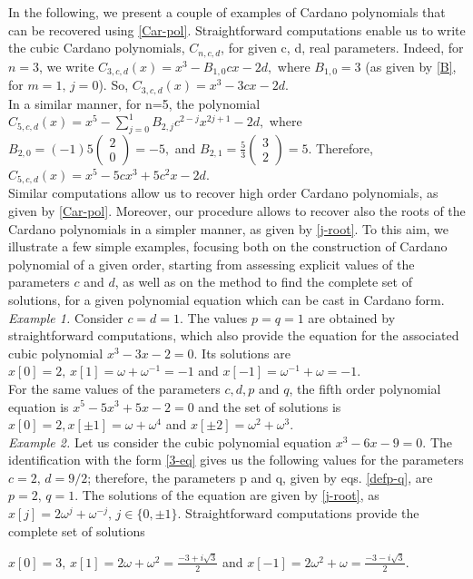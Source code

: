 \documentclass[11pt,reqno]{amsart}
\begin{document}
In the following, we present a couple of examples of Cardano polynomials that can be recovered using \eqref{Car-pol}. 
Straightforward computations enable us to write the cubic Cardano polynomials, $C_{n,c,d}$, for given c, d, real parameters. Indeed, for $n=3$, we write $C_{3,c,d}(x)=x^3-B_{1,0}cx-2d,$ where $B_{1,0}=3 $  (as given by \eqref{B}, for $m=1,\, j=0$). So, $C_{3,c,d}(x)=x^3-3cx-2d$.
\\
 In a similar manner, for n=5, the polynomial $C_{5,c,d}(x)=x^5-\sum\limits_{j=0}^{1}B_{2,j}c^{2-j}x^{2j+1}-2d,$    where
$B_{2,0}=(-1)5\begin{pmatrix}
    2\\0
\end{pmatrix}=-5, $ and $B_{2,1}=\frac{5}{3}\begin{pmatrix}
    3\\2
\end{pmatrix}=5.$ Therefore, $C_{5,c,d}(x)=x^5-5cx^3+5c^2x-2d$. \\Similar computations allow us to recover high order Cardano polynomials, as given by \eqref{Car-pol}.
Moreover, our procedure allows to recover also the roots of the Cardano polynomials in a simpler manner, as given by \eqref{j-root}.
To this aim, we illustrate a few simple examples, focusing both on the construction of Cardano polynomial of a given order, starting from assessing explicit values of the parameters $c$ and $d$, as well as on  the method to find the complete set of solutions, for a given polynomial equation which can be cast in Cardano form. 
\\
\textit{Example 1.} Consider $c=d=1$. The values $p=q=1$ are obtained by straightforward computations, which also provide the equation for the associated cubic polynomial $x^3-3x-2=0$. Its solutions are $x[0]=2,\, x[1]=\omega+\omega^{-1}=-1$ and $x[-1]=\omega^{-1}+\omega=-1$.
\\For the same values of the parameters $c, d, p$ and $q$,  the fifth order polynomial equation is $x^5-5x^3+5x-2=0$ and the set of solutions is $x[0]=2, x[\pm 1]=\omega+\omega^4$ and $x[\pm 2]=\omega^2+\omega^3$.
\\ \textit{Example 2.}
   Let us consider the cubic polynomial equation   $x^3-6x-9=0$. The identification with the form \eqref{3-eq} gives us the following values for the parameters $c=2,\, d=9/2$; therefore, the parameters p and q, given by eqs. \eqref{defp-q}, are $p=2,\,q=1$. The solutions of the equation are given by \eqref{j-root}, as  
$x[j]=2\omega^j+\omega^{-j},\, j\in\{0,\pm 1\}.$ Straightforward computations provide the complete set of solutions\begin{center}
    $x[0]=3,\, x[1]=2\omega+\omega^2=\frac{-3+i\sqrt{3}}{2}$ and $x[-1]=2\omega^2+\omega=\frac{-3-i\sqrt{3}}{2}$.
   \end{center}  
\end{document}
